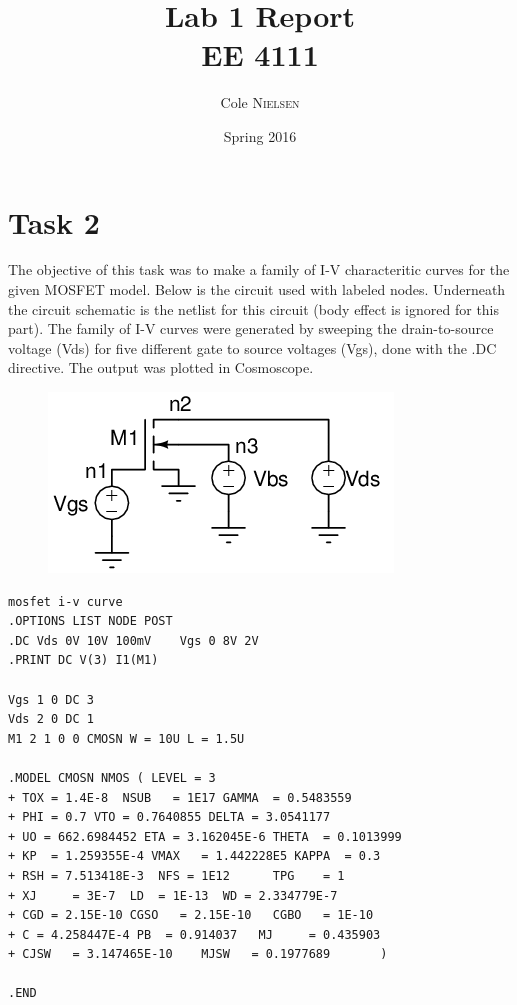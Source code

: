 \documentclass[12pt]{article}
\title{Lab 1 Report\\ \vspace{0.3 in} EE 4111}
\author{Cole \textsc{Nielsen}}
\date{Spring 2016}
\begin{document}
\maketitle 
\pagebreak
\section*{Task 2}
The objective of this task was to make a family of I-V characteritic curves for the given MOSFET model. Below is the circuit used with labeled nodes. Underneath the circuit schematic is the netlist for this circuit (body effect is ignored for this part). The family of I-V curves were generated by sweeping the drain-to-source voltage (Vds) for five different gate to source voltages (Vgs), done with the .DC directive. The output was plotted in Cosmoscope.
\FloatBarrier
\begin{figure}[h!]
\begin{center}
 \includegraphics[scale=0.7]{./2.png}
\end{center}
\end{figure}
\FloatBarrier
\begin{lstlisting}
mosfet i-v curve
.OPTIONS LIST NODE POST
.DC Vds 0V 10V 100mV	Vgs 0 8V 2V
.PRINT DC V(3) I1(M1)

Vgs 1 0 DC 3
Vds 2 0 DC 1
M1 2 1 0 0 CMOSN W = 10U L = 1.5U

.MODEL CMOSN NMOS ( LEVEL = 3 
+ TOX = 1.4E-8  NSUB   = 1E17 GAMMA  = 0.5483559          
+ PHI = 0.7 VTO = 0.7640855 DELTA = 3.0541177 
+ UO = 662.6984452 ETA = 3.162045E-6 THETA  = 0.1013999          
+ KP  = 1.259355E-4 VMAX   = 1.442228E5 KAPPA  = 0.3             
+ RSH = 7.513418E-3  NFS = 1E12      TPG    = 1                     
+ XJ     = 3E-7  LD  = 1E-13  WD = 2.334779E-7
+ CGD = 2.15E-10 CGSO   = 2.15E-10   CGBO   = 1E-10        
+ C = 4.258447E-4 PB  = 0.914037   MJ     = 0.435903 
+ CJSW   = 3.147465E-10    MJSW   = 0.1977689       )                                     

.END
\end{lstlisting}
\end{document}
